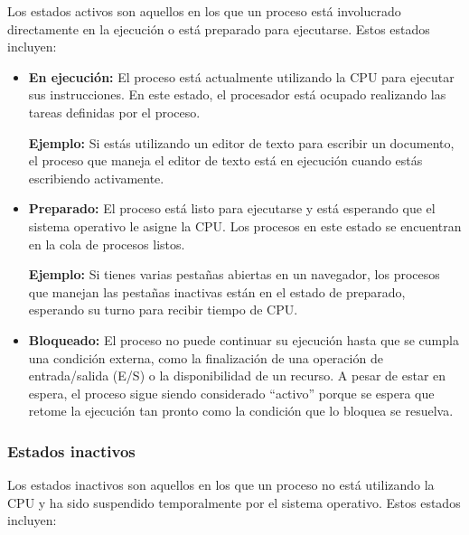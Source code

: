 Los estados activos son aquellos en los que un proceso está involucrado directamente en la ejecución o está preparado para ejecutarse. Estos estados incluyen:

\begin{tcolorbox}
\begin{itemize}
	\item \textbf{En ejecución:} El proceso está actualmente utilizando la CPU para ejecutar sus instrucciones. En este estado, el procesador está ocupado realizando las tareas definidas por el proceso. 
	
	\textbf{Ejemplo:} Si estás utilizando un editor de texto para escribir un documento, el proceso que maneja el editor de texto está en ejecución cuando estás escribiendo activamente.
	
	\item \textbf{Preparado:} El proceso está listo para ejecutarse y está esperando que el sistema operativo le asigne la CPU. Los procesos en este estado se encuentran en la cola de procesos listos. 
	
	\textbf{Ejemplo:} Si tienes varias pestañas abiertas en un navegador, los procesos que manejan las pestañas inactivas están en el estado de preparado, esperando su turno para recibir tiempo de CPU.
	
	\item \textbf{Bloqueado:} El proceso no puede continuar su ejecución hasta que se cumpla una condición externa, como la finalización de una operación de entrada/salida (E/S) o la disponibilidad de un recurso. A pesar de estar en espera, el proceso sigue siendo considerado ``activo'' porque se espera que retome la ejecución tan pronto como la condición que lo bloquea se resuelva.
	
\end{itemize}
\end{tcolorbox}

\subsubsection{Estados inactivos}

Los estados inactivos son aquellos en los que un proceso no está utilizando la CPU y ha sido suspendido temporalmente por el sistema operativo. Estos estados incluyen:

